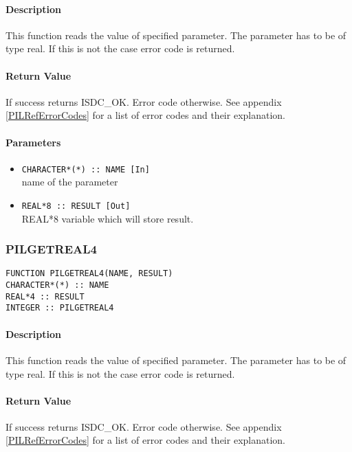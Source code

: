 \paragraph{Description\\}
This function reads the value of specified parameter. The parameter has to
be of type real. If this is not the
case error code is returned. 

\paragraph{Return Value\\}
If success returns ISDC\_OK. Error code otherwise. See appendix \ref{PILRefErrorCodes}
for a list of error codes and their explanation.

\paragraph{Parameters}
\begin{itemize}
\item
{\tt CHARACTER*(*) :: NAME [In] } \\
name of the parameter 
\item
{\tt REAL*8 :: RESULT [Out] } \\
REAL*8 variable which will store result.
\end{itemize}



\subsubsection{PILGETREAL4}

\begin{verbatim}
FUNCTION PILGETREAL4(NAME, RESULT) 
CHARACTER*(*) :: NAME 
REAL*4 :: RESULT 
INTEGER :: PILGETREAL4
\end{verbatim}

\paragraph{Description\\}
This function reads the value of specified parameter. The parameter has to
be of type real. If this is not the
case error code is returned. 

\paragraph{Return Value\\}
If success returns ISDC\_OK. Error code otherwise. See appendix \ref{PILRefErrorCodes}
for a list of error codes and their explanation.

